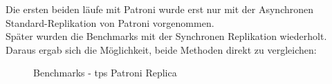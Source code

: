 \begin{flushleft}
    Die ersten beiden läufe mit Patroni wurde erst nur mit der Asynchronen Standard-Replikation von Patroni vorgenommen.\\
    Später wurden die Benchmarks mit der Synchronen Replikation wiederholt.\\
    Daraus ergab sich die Möglichkeit, beide Methoden direkt zu vergleichen:
    \begin{figure}[H]
        \centering
        \qquad
        \caption{Benchmarks - tps Patroni Replica}
        \label{fig:tps_patroni_replica}
    \end{figure}
    \begin{figure}[H]
        \centering

\end{figure}
\end{flushleft}
